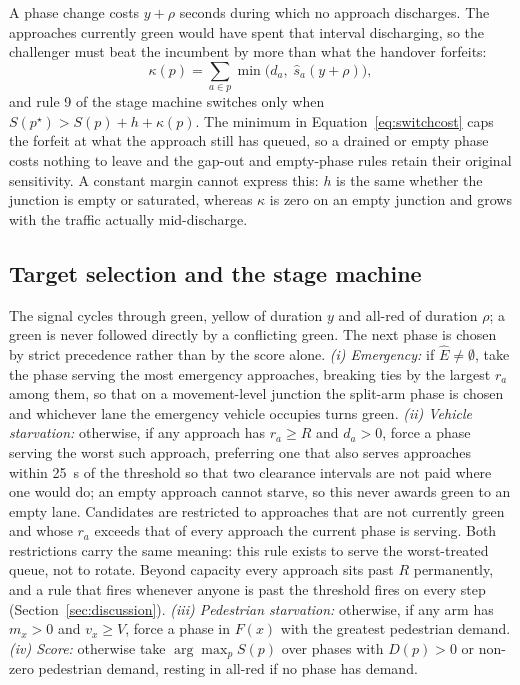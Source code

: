 \documentclass[journal]{IEEEtran}
\begin{document}
A phase change costs $y + \rho$ seconds during which no approach discharges. The approaches currently
green would have spent that interval discharging, so the challenger must beat the incumbent by more
than what the handover forfeits:
\begin{equation}
\kappa(p) = \sum_{a \in p} \min\bigl(d_a,\; \hat{s}_a (y + \rho)\bigr),
\label{eq:switchcost}
\end{equation}
and rule 9 of the stage machine switches only when $S(p^\star) > S(p) + h + \kappa(p)$. The minimum
in Equation~\ref{eq:switchcost} caps the forfeit at what the approach still has queued, so a drained
or empty phase costs nothing to leave and the gap-out and empty-phase rules retain their original
sensitivity. A constant margin cannot express this: $h$ is the same whether the junction is empty or
saturated, whereas $\kappa$ is zero on an empty junction and grows with the traffic actually
mid-discharge.

\subsection{Target selection and the stage machine}

The signal cycles through green, yellow of duration $y$ and all-red of duration $\rho$; a green is
never followed directly by a conflicting green. The next phase is chosen by strict precedence rather
than by the score alone. \emph{(i) Emergency:} if $\hat{E} \neq \emptyset$, take the phase serving the
most emergency approaches, breaking ties by the largest $r_a$ among them, so that on a movement-level
junction the split-arm phase is chosen and whichever lane the emergency vehicle occupies turns green.
\emph{(ii) Vehicle starvation:} otherwise, if any approach has $r_a \geq R$ and $d_a > 0$, force a
phase serving the worst such approach, preferring one that also serves approaches within 25~s of the
threshold so that two clearance intervals are not paid where one would do; an empty approach cannot
starve, so this never awards green to an empty lane. Candidates are restricted to approaches that are
not currently green and whose $r_a$ exceeds that of every approach the current phase is serving. Both
restrictions carry the same meaning: this rule exists to serve the worst-treated queue, not to
rotate. Beyond capacity every approach sits past $R$ permanently, and a rule that fires whenever
anyone is past the threshold fires on every step (Section~\ref{sec:discussion}). \emph{(iii) Pedestrian starvation:} otherwise, if
any arm has $m_x > 0$ and $v_x \geq V$, force a phase in $F(x)$ with the greatest pedestrian demand.
\emph{(iv) Score:} otherwise take $\arg\max_p S(p)$ over phases with $D(p) > 0$ or non-zero pedestrian
demand, resting in all-red if no phase has demand.
\end{document}
